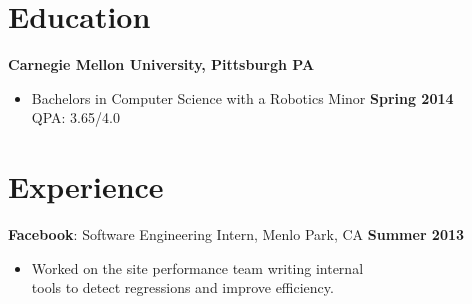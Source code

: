 \documentclass[sectioned]{dsyangres}
\begin{document}

\address{{\bf School Address} \\
  5032 Forbes Ave. SMC 4932 \\ Pittsburgh, PA 15289  \\
         }
\address{{\bf Home Address} \\
  5313 Betheny Circle \\
  Superior Township, MI 48198 \\
   }


\begin{resume}


\section{Education}

\textbf{Carnegie Mellon University, Pittsburgh PA}
  \begin{itemize}
    \item Bachelors in Computer Science with a Robotics Minor \hfill \textbf{ Spring 2014}
      \\ QPA: 3.65/4.0
  \end{itemize}



\section{Experience}

\textbf{Facebook}: Software Engineering Intern,
Menlo Park, CA \hfill \textbf{Summer 2013}
  \begin{itemize} \itemsep -2pt
    \item Worked on the site performance team writing internal \\
      tools to detect regressions and improve efficiency.
  \end{itemize}


\end{resume}
\end{document}
